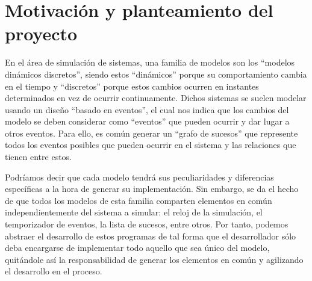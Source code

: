 \section{Motivación y planteamiento del proyecto}\label{sec:motivacion}

En el área de simulación de sistemas, una familia de modelos son los “modelos
dinámicos discretos”, siendo estos “dinámicos” porque su comportamiento cambia
en el tiempo y “discretos” porque estos cambios ocurren en instantes
determinados en vez de ocurrir continuamente.
Dichos sistemas se suelen modelar usando un diseño “basado en eventos”, el cual
nos indica que los cambios del modelo se deben considerar como “eventos” que
pueden ocurrir y dar lugar a otros eventos. Para ello, es común generar un
“grafo de sucesos” que represente todos los eventos posibles que pueden ocurrir
en el sistema y las relaciones que tienen entre estos.

Podríamos decir que cada modelo tendrá sus peculiaridades y diferencias
específicas a la hora de generar su implementación. Sin embargo, se da el hecho
de que todos los modelos de esta familia comparten elementos en común
independientemente del sistema a simular: el reloj de la simulación, el
temporizador de eventos, la lista de sucesos, entre otros. Por tanto, podemos
abstraer el desarrollo de estos programas de tal forma que el desarrollador sólo
deba encargarse de implementar todo aquello que sea único del modelo, quitándole
así la responsabilidad de generar los elementos en común y agilizando el
desarrollo en el proceso.




